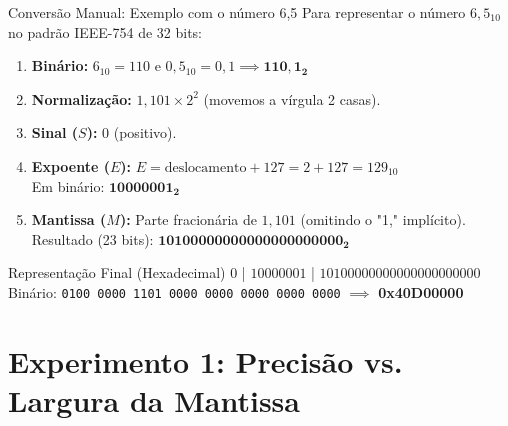 \documentclass[aspectratio=169]{beamer}
\begin{document}
\begin{frame}{Conversão Manual: Exemplo com o número 6,5}
	\justifying
	Para representar o número $6,5_{10}$ no padrão IEEE-754 de 32 bits:
	
	\begin{enumerate}
		\item \textbf{Binário:} $6_{10} = 110$ e $0,5_{10} = 0,1 \implies \mathbf{110,1_2}$
		\item \textbf{Normalização:} $1,101 \times 2^2$ (movemos a vírgula 2 casas).
		\item \textbf{Sinal ($S$):} $0$ (positivo).
		\item \textbf{Expoente ($E$):} $E = \text{deslocamento} + 127 = 2 + 127 = 129_{10}$ \\
		Em binário: $\mathbf{10000001_2}$
		\item \textbf{Mantissa ($M$):} Parte fracionária de $1,101$ (omitindo o "1," implícito). \\
		Resultado (23 bits): $\mathbf{10100000000000000000000_2}$
	\end{enumerate}
	
	\begin{block}{Representação Final (Hexadecimal)}
		$0$ | $10000001$ | $10100000000000000000000$ \\
		Binário: \texttt{0100 0000 1101 0000 0000 0000 0000 0000} $\implies$ \textbf{0x40D00000}
	\end{block}
\end{frame}










\section{Experimento 1: Precisão vs. Largura da Mantissa}
\end{document}
